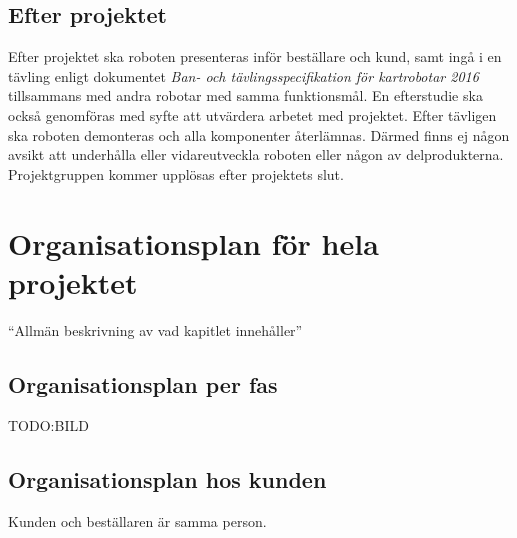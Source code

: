 \documentclass{article}
\begin{document}
\subsection{Efter projektet}
Efter projektet ska roboten presenteras inför beställare och kund, samt ingå i en tävling enligt dokumentet \textit{Ban- och tävlingsspecifikation för kartrobotar 2016} tillsammans med andra robotar med samma funktionsmål. En efterstudie ska också genomföras med syfte att utvärdera arbetet med projektet. Efter tävligen ska roboten demonteras och alla komponenter återlämnas. Därmed finns ej någon avsikt att underhålla eller vidareutveckla roboten eller någon av delprodukterna. Projektgruppen kommer upplösas efter projektets slut.

\section{Organisationsplan för hela projektet}
``Allmän beskrivning av vad kapitlet innehåller''
\subsection{Organisationsplan per fas}
TODO:BILD

\subsection{Organisationsplan hos kunden}
Kunden och beställaren är samma person.
\end{document}
